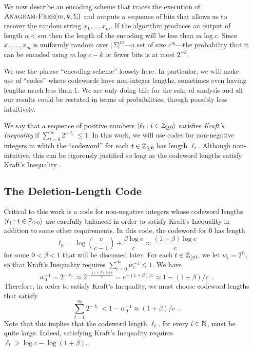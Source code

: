 \documentclass{patmorin}
\begin{document}
We now describe an encoding scheme that traces the execution of $\textsc{Anagram-Free}(m, k, \Sigma)$ and outputs a sequence of bits that allows us to recover the random string $x_1,\ldots,x_m$.  If the algorithm produces an output of length $n < \epsilon m$ then the length of the encoding will be less than $m\log c$.  Since $x_1,\ldots,x_m$ is uniformly random over $|\Sigma|^m$---a set of size $c^m$---the probability that it can be encoded using $m\log c - k$ or fewer bits is at most $2^{-k}$.

We use the phrase ``encoding scheme'' loosely here.  In particular, we will make use of ``codes'' where codewords have non-integer lengths, sometimes even having lengths much less than 1.  We are only doing this for the sake of analysis and all our results could be restated in terms of probabilities, though possibly less intuitively.

We say that a sequence of positive numbers $\langle \ell_t : t\in\mathbb{Z}_{\ge 0}\rangle$ satisfies \emph{Kraft's Inequality} if $\sum_{t=0}^{\infty} 2^{-\ell_t} \le 1$.  In this work, we will use codes for non-negative integers in which the ``codeword'' for each $t\in\mathbb{Z}_{\ge 0}$ has length $\ell_t$. Although non-intuitive, this can be rigorously justified so long as the codeword lengths satisfy Kraft's Inequality \cite[Section~7]{morin.mulzer.ea:encoding}.

\subsection{The Deletion-Length Code}

Critical to this work is a code for non-negative integers whose codeword lengths $\langle \ell_t:t\in\mathbb{Z}_{\ge0}\rangle$ are carefully balanced in order to satisfy Kraft's Inequality in addition to some other requirements.  In this code, the codeword for 0 has length
\[
     \ell_0 = \log\left(\frac{c}{c-1}\right)+\frac{\beta\log e}{c}
       \approx \frac{(1+\beta)\log e}{c}
\]
for some $0 < \beta <1$ that will be discussed later.  For each $t\in \mathbb{Z}_{\ge0}$, we let $w_t=2^{\ell_t}$, so that Kraft's Inequality requires $\sum_{t=0}^\infty w_t^{-1} \le 1$.  We have
\[
   w_0^{-1} = 2^{-\ell_0} \approx 2^{-\tfrac{(1+\beta)\log e}{c}} = e^{-(1+\beta)/c} \approx 1-(1+\beta)/c \enspace .
\]
Therefore, in order to satisfy Kraft's Inequality, we must choose codeword lengths that satisfy
\[
   \sum_{t=1}^\infty 2^{-\ell_t} < 1-w_0^{-1} \approx (1+\beta)/c \enspace .
\]
Note that this implies that the codeword length $\ell_t$, for every $t\in\mathbb{N}$, must be quite large.  Indeed, satisfying Kraft's Inequality requires $\ell_t > \log c - \log(1+\beta)$.
\end{document}
